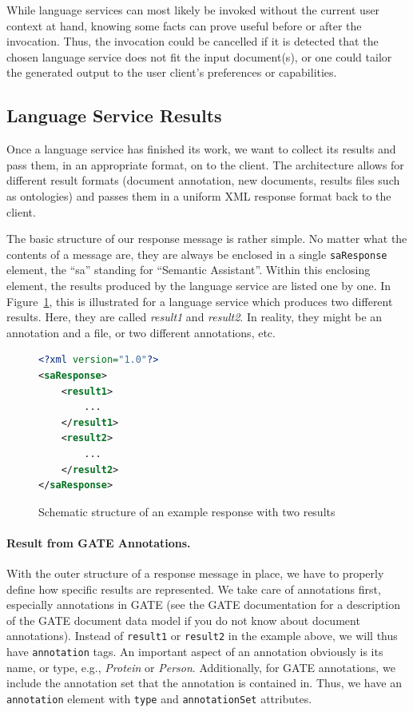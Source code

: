 While language services can most likely be invoked without the current
user context at hand, knowing some facts can prove useful before or
after the invocation. Thus, the invocation could be cancelled if it
is detected that the chosen language service does not fit the input
document(s), or one could tailor the generated output to the user
client's preferences or capabilities.


\subsection{Language Service Results}
\label{sec:response}
Once a language service has finished its work, we want to collect its
results and pass them, in an appropriate format, on to the client. The
\sa architecture allows for different result formats (document
annotation, new documents, results files such as ontologies) and
passes them in a uniform XML response format back to the client.

The basic structure of our response message is rather simple. No
matter what the contents of a message are, they are always be enclosed
in a single \texttt{saResponse} element, the ``sa'' standing for
``Semantic Assistant''. Within this enclosing element, the results
produced by the language service are listed one by one. In
Figure~\ref{list:response1}, this is illustrated for a language
service which produces two different results. Here, they are called
\emph{result1} and \emph{result2}. In reality, they might be an
annotation and a file, or two different annotations, etc.

\begin{figure}[htb]
\begin{lstlisting}[language=XML,xleftmargin=8mm,columns=flexible]
<?xml version="1.0"?>
<saResponse>
    <result1>
        ...
    </result1>
    <result2>
        ...
    </result2>
</saResponse>
\end{lstlisting}
\vspace*{-2mm}
\caption{Schematic structure of an example response with two results}
\label{list:response1}
\end{figure}


\paragraph{Result from GATE Annotations.} With the outer structure of a response
message in place, we have to properly define how specific results are
represented. We take care of annotations first, especially annotations
in GATE (see the GATE documentation for a description of the GATE
document data model if you do not know about document annotations).
Instead of \texttt{result1} or \texttt{result2} in the example above,
we will thus have \texttt{annotation} tags. An important aspect of an
annotation obviously is its name, or type, e.g., \emph{Protein} or
\emph{Person}.  Additionally, for GATE annotations, we include the
annotation set that the annotation is contained in. Thus, we have an
\texttt{annotation} element with \texttt{type} and
\texttt{annotationSet} attributes.

